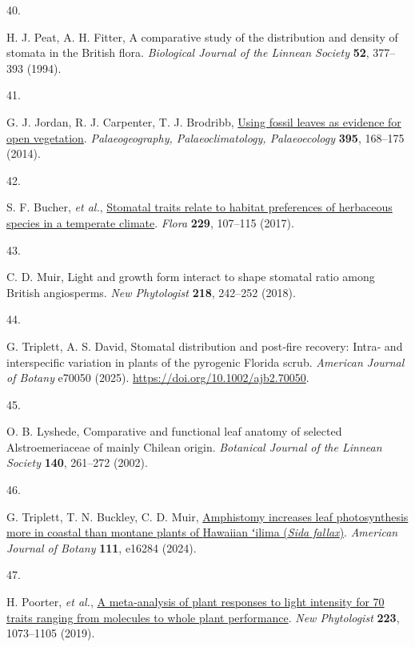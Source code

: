 \documentclass[
  letterpaper,
  DIV=11,
  numbers=noendperiod]{scrartcl}
\newlength{\cslhangindent}
\newlength{\csllabelwidth}
\newenvironment{CSLReferences}[2] %
 {\begin{list}{}{%
  \setlength{\itemindent}{0pt}
  \setlength{\leftmargin}{0pt}
  \setlength{\parsep}{0pt}
  \ifodd #1
   \setlength{\leftmargin}{\cslhangindent}
   \setlength{\itemindent}{-1\cslhangindent}
  \fi
  \setlength{\itemsep}{#2\baselineskip}}}
 {\end{list}}
\newcommand{\CSLLeftMargin}[1]{\parbox[t]{\csllabelwidth}{\strut#1\strut}}
\newcommand{\CSLRightInline}[1]{\parbox[t]{\linewidth - \csllabelwidth}{\strut#1\strut}}
\begin{document}
\begin{CSLReferences}{0}{1}
\CSLLeftMargin{40. }%
\CSLRightInline{H. J. Peat, A. H. Fitter, A comparative study of the
distribution and density of stomata in the {British} flora.
\emph{Biological Journal of the Linnean Society} \textbf{52}, 377--393
(1994).}

\CSLLeftMargin{41. }%
\CSLRightInline{G. J. Jordan, R. J. Carpenter, T. J. Brodribb,
\href{https://doi.org/10.1016/j.palaeo.2013.12.035}{Using fossil leaves
as evidence for open vegetation}. \emph{Palaeogeography,
Palaeoclimatology, Palaeoecology} \textbf{395}, 168--175 (2014).}

\CSLLeftMargin{42. }%
\CSLRightInline{S. F. Bucher, \emph{et al.},
\href{https://doi.org/10.1016/j.flora.2017.02.011}{Stomatal traits
relate to habitat preferences of herbaceous species in a temperate
climate}. \emph{Flora} \textbf{229}, 107--115 (2017).}

\CSLLeftMargin{43. }%
\CSLRightInline{C. D. Muir, Light and growth form interact to shape
stomatal ratio among {British} angiosperms. \emph{New Phytologist}
\textbf{218}, 242--252 (2018).}

\CSLLeftMargin{44. }%
\CSLRightInline{G. Triplett, A. S. David, Stomatal distribution and
post‐fire recovery: {Intra}‐ and interspecific variation in plants of
the pyrogenic {Florida} scrub. \emph{American Journal of Botany} e70050
(2025). \url{https://doi.org/10.1002/ajb2.70050}.}

\CSLLeftMargin{45. }%
\CSLRightInline{O. B. Lyshede, Comparative and functional leaf anatomy
of selected {Alstroemeriaceae} of mainly {Chilean} origin.
\emph{Botanical Journal of the Linnean Society} \textbf{140}, 261--272
(2002).}

\CSLLeftMargin{46. }%
\CSLRightInline{G. Triplett, T. N. Buckley, C. D. Muir,
\href{https://doi.org/10.1002/ajb2.16284}{Amphistomy increases leaf
photosynthesis more in coastal than montane plants of {Hawaiian} ʻilima
(\emph{{Sida} fallax})}. \emph{American Journal of Botany} \textbf{111},
e16284 (2024).}

\CSLLeftMargin{47. }%
\CSLRightInline{H. Poorter, \emph{et al.},
\href{https://doi.org/10.1111/nph.15754}{A meta‐analysis of plant
responses to light intensity for 70 traits ranging from molecules to
whole plant performance}. \emph{New Phytologist} \textbf{223},
1073--1105 (2019).}


\end{CSLReferences}
\end{document}
